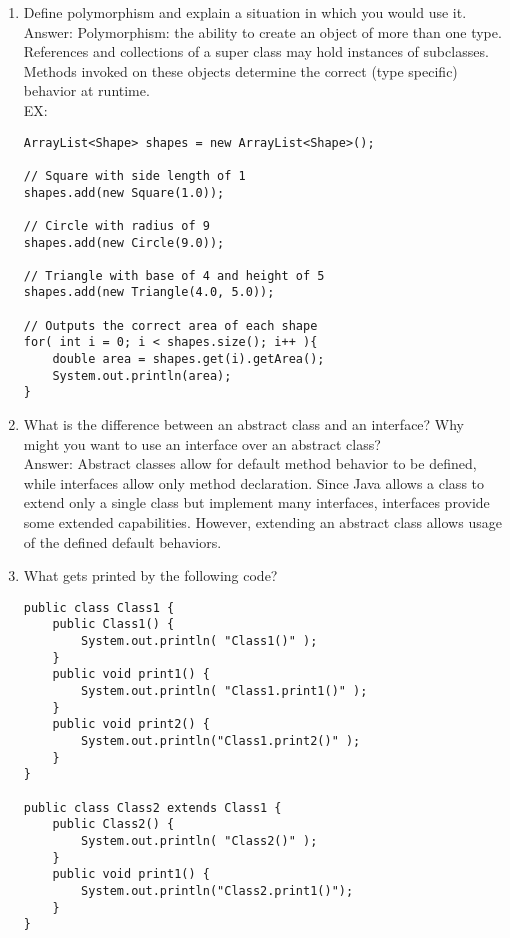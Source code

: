 \documentclass[11pt]{article}
\newenvironment{answer}{\large\lstset{basicstyle=\large\ttfamily}\color{white} \small{Answer:}}{}
\newenvironment{answer}{\large\lstset{basicstyle=\large\ttfamily}\color{red} \small{Answer:}}{}
\begin{document}
\begin{enumerate}
\item Define polymorphism and explain a situation in which you would use it. \\
\begin{answer}
Polymorphism: the ability to create an object of more than one type. References and collections of a super class may hold instances of subclasses. Methods invoked on these objects determine the correct (type specific) behavior at runtime. \\
EX:
		\begin{lstlisting}
ArrayList<Shape> shapes = new ArrayList<Shape>();

// Square with side length of 1
shapes.add(new Square(1.0));

// Circle with radius of 9
shapes.add(new Circle(9.0));

// Triangle with base of 4 and height of 5
shapes.add(new Triangle(4.0, 5.0));

// Outputs the correct area of each shape
for( int i = 0; i < shapes.size(); i++ ){ 
   	double area = shapes.get(i).getArea();
   	System.out.println(area);
}
        \end{lstlisting}
\end{answer}


\item What is the difference between an abstract class and an interface? Why might you want to use an interface over an abstract class? \\
\begin{answer}
Abstract classes allow for default method behavior to be defined, while interfaces allow only method declaration.  Since Java allows a class to extend only a single class but implement many interfaces, interfaces provide some extended capabilities. However, extending an abstract class allows usage of the defined default behaviors. 
\end{answer}


\newpage


\item What gets printed by the following code?
\begin{multicols}{2}
\begin{lstlisting}
public class Class1 {
	public Class1() {
		System.out.println( "Class1()" );
	}
	public void print1() {
		System.out.println( "Class1.print1()" );
	}
	public void print2() {
		System.out.println("Class1.print2()" );
	}
}

public class Class2 extends Class1 {
	public Class2() {
		System.out.println( "Class2()" );
	}
	public void print1() {
		System.out.println("Class2.print1()");
	}
}


\end{lstlisting}
\end{multicols}
\end{enumerate}
\end{document}
